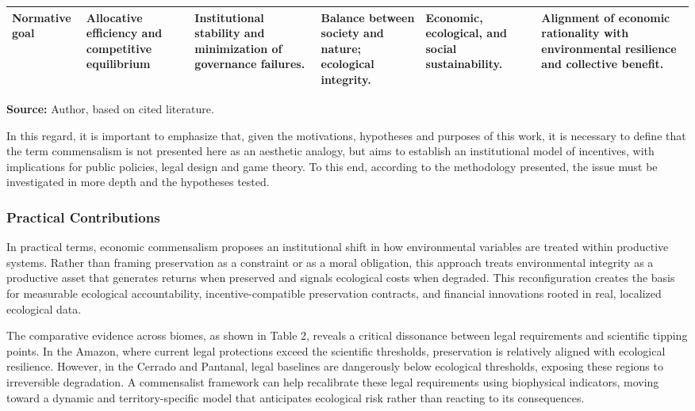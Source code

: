 \begin{table}[H]
{\begin{tabularx}{\textwidth}{lXXXXX}
\textbf{Normative goal} 
& Allocative efficiency and competitive equilibrium 
& Institutional stability and minimization of governance failures. 
& Balance between society and nature; ecological integrity. 
& Economic, ecological, and social sustainability. 
& Alignment of economic rationality with environmental resilience and collective benefit. \\

\bottomrule
\end{tabularx}}

\vspace{0.1em}
\begin{flushleft}
\footnotesize
\textbf{Source:} Author, based on cited literature.
\end{flushleft}

\end{table}

In this regard, it is important to emphasize that, given the motivations, hypotheses and purposes of this work, it is necessary to define that the term commensalism is not presented here as an aesthetic analogy, but aims to establish an institutional model of incentives, with implications for public policies, legal design and game theory. To this end, according to the methodology presented, the issue must be investigated in more depth and the hypotheses tested.

\subsubsection{Practical Contributions}

In practical terms, economic commensalism proposes an institutional shift in how environmental variables are treated within productive systems. Rather than framing preservation as a constraint or as a moral obligation, this approach treats environmental integrity as a productive asset that generates returns when preserved and signals ecological costs when degraded. This reconfiguration creates the basis for measurable ecological accountability, incentive-compatible preservation contracts, and financial innovations rooted in real, localized ecological data.

The comparative evidence across biomes, as shown in Table 2, reveals a critical dissonance between legal requirements and scientific tipping points. In the Amazon, where current legal protections exceed the scientific thresholds, preservation is relatively aligned with ecological resilience. However, in the Cerrado and Pantanal, legal baselines are dangerously below ecological thresholds, exposing these regions to irreversible degradation. A commensalist framework can help recalibrate these legal requirements using biophysical indicators, moving toward a dynamic and territory-specific model that anticipates ecological risk rather than reacting to its consequences.

